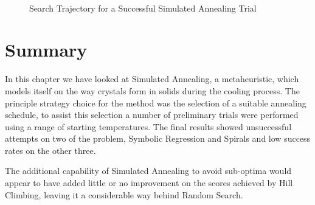 \begin{figure}[hbp]
\centerline{\hbox{
}}
\caption{\label{sa_search1}Search Trajectory for a Successful Simulated Annealing Trial}
\end{figure}



\section{Summary}
In this chapter we have looked at Simulated Annealing, a metaheuristic, which models itself on the way crystals form in solids during the cooling process. The principle strategy choice for the method was the selection of a suitable annealing schedule, to assist this selection a number of preliminary trials were performed using a range of starting temperatures. The final results showed unsuccessful attempts on two of the problem, Symbolic Regression and Spirals and low success rates on the other three.

The additional capability of Simulated Annealing to avoid sub-optima would appear to have added little or no improvement on the scores achieved by Hill Climbing, leaving it a considerable way behind Random Search. 





















